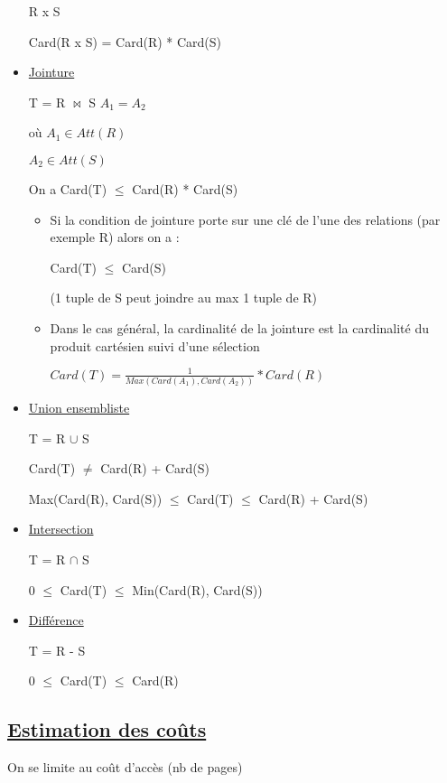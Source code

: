 \documentclass{article}
\begin{document}
\begin{itemize}
R x S

Card(R x S) = Card(R) * Card(S)

	\item \underline{Jointure}

T = R $\bowtie$ S               $A_{1} = A_{2}$

où $A_{1} \in Att(R)$

$A_{2} \in Att(S)$

On a Card(T) $\leq$ Card(R) * Card(S)

	\begin{itemize}
		\item Si la condition de jointure porte sur une clé de l'une des relations (par exemple R) alors on a :

Card(T) $\leq$ Card(S)

(1 tuple de S peut joindre au max 1 tuple de R)

		\item Dans le cas général, la cardinalité de la jointure est la cardinalité du produit cartésien suivi d'une sélection

$Card(T) = \frac{1}{Max(Card(A_{1}), Card(A_{2}))} * Card(R)$

	\end{itemize}

	\item \underline{Union ensembliste}

T = R $\cup$ S 

Card(T) $\neq$ Card(R) + Card(S)

Max(Card(R), Card(S)) $\leq$ Card(T) $\leq$ Card(R) + Card(S)

	\item \underline{Intersection}

T = R $\cap$ S

0 $\leq$ Card(T) $\leq$ Min(Card(R), Card(S))

	\item \underline{Différence}

T = R - S

0 $\leq$ Card(T) $\leq$ Card(R)

\end{itemize}

\subsection*{\underline{Estimation des coûts}}

On se limite au coût d'accès (nb de pages)
\end{document}
